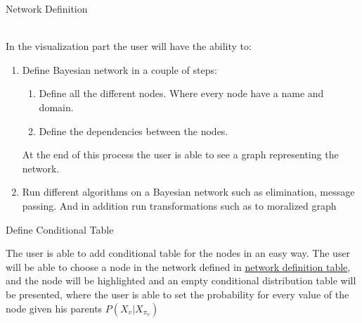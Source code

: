 \documentclass{article}
\begin{document}
    \hypertarget{network_defeniton}{Network Definition}\\
    In the visualization part the user will have the ability to:
    \begin{enumerate}
        \item Define Bayesian network in a couple of steps:
        \begin{enumerate}
            \item Define all the different nodes. Where every node have a name and domain.
            \item Define the dependencies between the nodes.
        \end{enumerate}
        At the end of this process the user is able to see a graph representing the network.
        \item Run different algorithms on a Bayesian network such as elimination, message passing. And in addition run transformations such as to moralized graph 
    \end{enumerate}

    \hypertarget{define conditional table}{ Define Conditional Table}
    The user is able to add conditional table for the nodes in an easy way. The user will be able to choose a node in the network defined in \hyperlink{network definition}{network definition table},
    and the node will be highlighted and an empty conditional distribution table will be presented, where the user is able to set the probability for every value of
    the node given his parents $P(X_v|X_{\pi_v})$

    \vspace{0.5cm}
\end{document}
